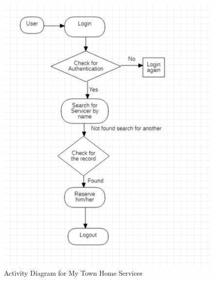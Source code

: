 \documentclass[12pt,a4paper]{report}
\begin{document}
\begin{titlepage}
{\begin{figure}[h!]
\begin{center}
		\includegraphics[width=\linewidth]{flow.jpeg}
	\end{center}
	\caption{Activity Diagram for My Town Home Services}
\end{figure}
\newpage
}
\end{titlepage}
\end{document}
